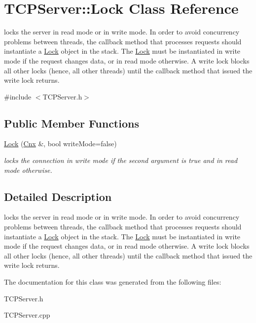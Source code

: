 \hypertarget{class_t_c_p_server_1_1_lock}{\section{T\-C\-P\-Server\-:\-:Lock Class Reference}
\label{class_t_c_p_server_1_1_lock}
}


locks the server in read mode or in write mode. In order to avoid concurrency problems between threads, the callback method that processes requests should instantiate a \hyperlink{class_t_c_p_server_1_1_lock}{Lock} object in the stack. The \hyperlink{class_t_c_p_server_1_1_lock}{Lock} must be instantiated in write mode if the request changes data, or in read mode otherwise. A write lock blocks all other locks (hence, all other threads) until the callback method that issued the write lock returns.  




{\ttfamily \#include $<$T\-C\-P\-Server.\-h$>$}

\subsection*{Public Member Functions}
\begin{DoxyCompactItemize}
\item 
\hypertarget{class_t_c_p_server_1_1_lock_a4b1fa591dde407aacd93133828cfac81}{\hyperlink{class_t_c_p_server_1_1_lock_a4b1fa591dde407aacd93133828cfac81}{Lock} (\hyperlink{class_t_c_p_server_1_1_cnx}{Cnx} \&, bool write\-Mode=false)}\label{class_t_c_p_server_1_1_lock_a4b1fa591dde407aacd93133828cfac81}

\begin{DoxyCompactList}\small\item\em locks the connection in write mode if the second argument is true and in read mode otherwise. \end{DoxyCompactList}\end{DoxyCompactItemize}


\subsection{Detailed Description}
locks the server in read mode or in write mode. In order to avoid concurrency problems between threads, the callback method that processes requests should instantiate a \hyperlink{class_t_c_p_server_1_1_lock}{Lock} object in the stack. The \hyperlink{class_t_c_p_server_1_1_lock}{Lock} must be instantiated in write mode if the request changes data, or in read mode otherwise. A write lock blocks all other locks (hence, all other threads) until the callback method that issued the write lock returns. 

The documentation for this class was generated from the following files\-:\begin{DoxyCompactItemize}
\item 
T\-C\-P\-Server.\-h\item 
T\-C\-P\-Server.\-cpp\end{DoxyCompactItemize}
